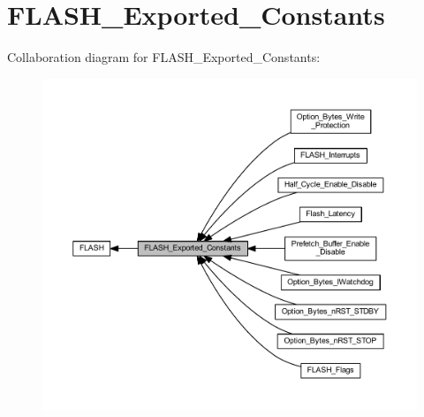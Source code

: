 \hypertarget{group___f_l_a_s_h___exported___constants}{}\section{F\+L\+A\+S\+H\+\_\+\+Exported\+\_\+\+Constants}
\label{group___f_l_a_s_h___exported___constants}
Collaboration diagram for F\+L\+A\+S\+H\+\_\+\+Exported\+\_\+\+Constants\+:
\nopagebreak
\begin{figure}[H]
\begin{center}
\leavevmode
\includegraphics[width=350pt]{group___f_l_a_s_h___exported___constants}
\end{center}
\end{figure}
